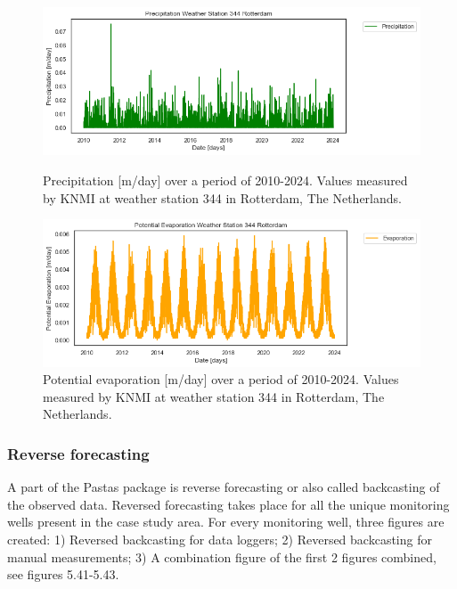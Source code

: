\begin{figure}[h]
    \centering
    \begin{minipage}{0.45\textwidth}
        \centering
        \includegraphics[width=\linewidth]{figures/roz/p.png}
        \caption{Precipitation [m/day] over a period of 2010-2024. Values measured by KNMI at weather station 344 in Rotterdam, The Netherlands.}
        \label{fig:fig1}
    \end{minipage}\hfill
    \begin{minipage}{0.45\textwidth}
        \centering
        \includegraphics[width=\linewidth]{figures/roz/potevap.png}
        \caption{Potential evaporation [m/day] over a period of 2010-2024. Values measured by KNMI at weather station 344 in Rotterdam, The Netherlands.}
        \label{fig:fig2}
    \end{minipage}
\end{figure}

\newline

\subsubsection{Reverse forecasting}
A part of the Pastas package is reverse forecasting or also called backcasting of the observed data. Reversed forecasting takes place for all the unique monitoring wells present in the case study area. For every monitoring well, three figures are created: 1) Reversed backcasting for data loggers; 2) Reversed backcasting for manual measurements; 3) A combination figure of the first 2 figures combined, see figures 5.41-5.43. 

